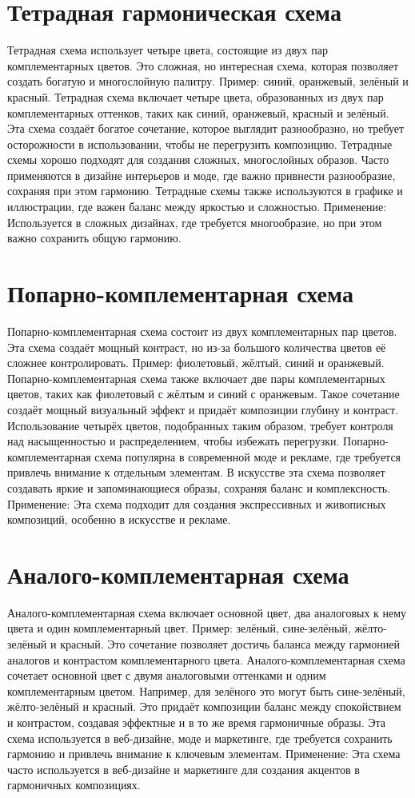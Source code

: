 \documentclass[bachelor, och, referat]{SCWorks}
\begin{document}
\section{Тетрадная гармоническая схема}
Тетрадная схема использует четыре цвета, состоящие из двух пар комплементарных цветов. Это сложная, но интересная схема, которая позволяет создать богатую и многослойную палитру. Пример: синий, оранжевый, зелёный и красный.
Тетрадная схема включает четыре цвета, образованных из двух пар комплементарных оттенков, таких как синий, оранжевый, красный и зелёный. Эта схема создаёт богатое сочетание, которое выглядит разнообразно, но требует осторожности в использовании, чтобы не перегрузить композицию. Тетрадные схемы хорошо подходят для создания сложных, многослойных образов.
Часто применяются в дизайне интерьеров и моде, где важно привнести разнообразие, сохраняя при этом гармонию. Тетрадные схемы также используются в графике и иллюстрации, где важен баланс между яркостью и сложностью.
Применение: Используется в сложных дизайнах, где требуется многообразие, но при этом важно сохранить общую гармонию.

\section{Попарно-комплементарная схема}
Попарно-комплементарная схема состоит из двух комплементарных пар цветов. Эта схема создаёт мощный контраст, но из-за большого количества цветов её сложнее контролировать. Пример: фиолетовый, жёлтый, синий и оранжевый.
Попарно-комплементарная схема также включает две пары комплементарных цветов, таких как фиолетовый с жёлтым и синий с оранжевым. Такое сочетание создаёт мощный визуальный эффект и придаёт композиции глубину и контраст. Использование четырёх цветов, подобранных таким образом, требует контроля над насыщенностью и распределением, чтобы избежать перегрузки.
Попарно-комплементарная схема популярна в современной моде и рекламе, где требуется привлечь внимание к отдельным элементам. В искусстве эта схема позволяет создавать яркие и запоминающиеся образы, сохраняя баланс и комплексность.
Применение: Эта схема подходит для создания экспрессивных и живописных композиций, особенно в искусстве и рекламе.

\section{Аналого-комплементарная схема}
Аналого-комплементарная схема включает основной цвет, два аналоговых к нему цвета и один комплементарный цвет. Пример: зелёный, сине-зелёный, жёлто-зелёный и красный. Это сочетание позволяет достичь баланса между гармонией аналогов и контрастом комплементарного цвета.
Аналого-комплементарная схема сочетает основной цвет с двумя аналоговыми оттенками и одним комплементарным цветом. Например, для зелёного это могут быть сине-зелёный, жёлто-зелёный и красный. Это придаёт композиции баланс между спокойствием и контрастом, создавая эффектные и в то же время гармоничные образы.
Эта схема используется в веб-дизайне, моде и маркетинге, где требуется сохранить гармонию и привлечь внимание к ключевым элементам.
Применение: Эта схема часто используется в веб-дизайне и маркетинге для создания акцентов в гармоничных композициях.
\end{document}
